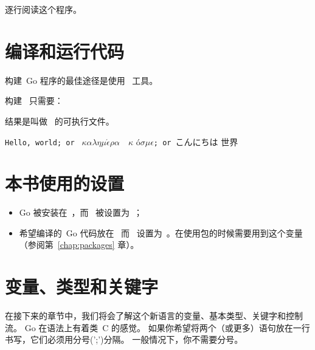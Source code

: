
逐行阅读这个程序。
\showremarks

\section{编译和运行代码}
\label{sec:building a program}
构建~Go 程序的最佳途径是使用~ 工具。

构建~ 只需要：
\begin{display}
\pr {}
\end{display}
结果是叫做~ 的可执行文件。

\begin{display}
\pr {}
\end{display}

\vspace{-3.0ex}
\texttt{Hello, world; or }%
\begin{math}\kappa\alpha\lambda\eta\mu\acute{\epsilon}\rho\alpha\hspace{1em}\kappa\end{math}%
\'o\begin{math} \sigma\mu\epsilon\end{math}\texttt{; or }こんにちは 世界
\ \newline
\ \newline

\section{本书使用的设置}
\label{sec:settings_used}
\begin{itemize}                            
\item Go 被安装在~，而~ 被设置为~；
\item 希望编译的~Go 代码放在~ 
而~ 设置为~。在使用包的时候需要用到这个变量（参阅第~\ref{chap:packages} 章）。
\end{itemize}

\section{变量、类型和关键字}
\label{sec:vars}
在接下来的章节中，我们将会了解这个新语言的变量、基本类型、关键字和控制流。
Go 在语法上有着类~C 的感觉。
如果你希望将两个（或更多）语句放在一行书写，它们必须用分号(';')分隔。
一般情况下，你不需要分号。

